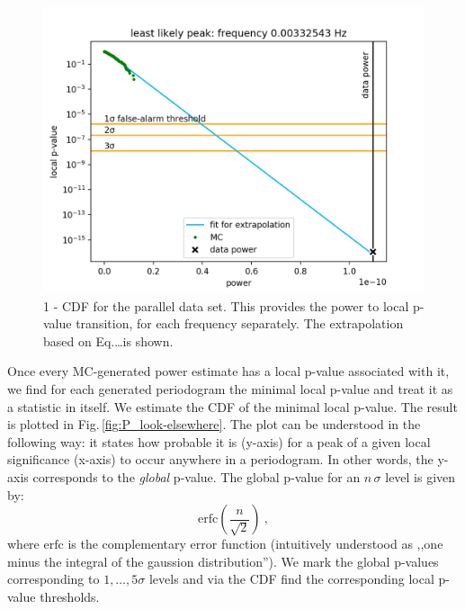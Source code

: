 \begin{figure}
  \centering
  \includegraphics[width=0.9\linewidth]{gfx/axions/P_best_signal_candidate.png}
  \caption{1 - CDF for the parallel data set. This provides the power to local p-value transition, for each frequency separately. The extrapolation based on Eq.\ldots is shown.}
  \label{fig:P_best_signal_candidate}
\end{figure}

Once every MC-generated power estimate has a local p-value associated with it, we find for each generated periodogram the minimal local p-value and treat it as a statistic in itself. We estimate the CDF of the minimal local p-value. The result is plotted in Fig.\,\ref{fig:P_look-elsewhere}. The plot can be understood in the following way: it states how probable it is (y-axis) for a peak of a given local significance (x-axis) to occur anywhere in a periodogram. In other words, the y-axis corresponds to the \emph{global} p-value. The global p-value for an $n\,\sigma$ level is given by:
\begin{equation}
  \mathrm{erfc}\left( \frac{n}{\sqrt{2}} \right)\ ,
\end{equation}
where $\mathrm{erfc}$ is the complementary error function (intuitively understood as ,,one minus the integral of the gaussion distribution''). We mark the global p-values corresponding to $1,\ldots,5\sigma$ levels and via the CDF find the corresponding local p-value thresholds.

